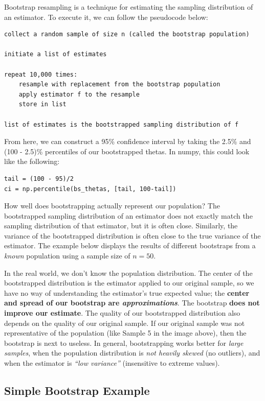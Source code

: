 \documentclass[
  letterpaper,
  DIV=11,
  numbers=noendperiod]{scrreprt}
\begin{document}
Bootstrap resampling is a technique for estimating the sampling
distribution of an estimator. To execute it, we can follow the
pseudocode below:

\begin{verbatim}
collect a random sample of size n (called the bootstrap population)

initiate a list of estimates

repeat 10,000 times:
    resample with replacement from the bootstrap population
    apply estimator f to the resample
    store in list

list of estimates is the bootstrapped sampling distribution of f
\end{verbatim}

From here, we can construct a 95\% confidence interval by taking the
2.5\% and (100 - 2.5)\% percentiles of our bootstrapped thetas. In
numpy, this could look like the following:

\begin{verbatim}
tail = (100 - 95)/2
ci = np.percentile(bs_thetas, [tail, 100-tail])
\end{verbatim}

How well does bootstrapping actually represent our population? The
bootstrapped sampling distribution of an estimator does not exactly
match the sampling distribution of that estimator, but it is often
close. Similarly, the variance of the bootstrapped distribution is often
close to the true variance of the estimator. The example below displays
the results of different bootstraps from a \emph{known} population using
a sample size of \(n=50\).

In the real world, we don't know the population distribution. The center
of the bootstrapped distribution is the estimator applied to our
original sample, so we have no way of understanding the estimator's true
expected value; the \textbf{center and spread of our bootstrap are
\emph{approximations}}. The bootstrap \textbf{does not improve our
estimate}. The quality of our bootstrapped distribution also depends on
the quality of our original sample. If our original sample was not
representative of the population (like Sample 5 in the image above),
then the bootstrap is next to useless. In general, bootstrapping works
better for \emph{large samples}, when the population distribution is
\emph{not heavily skewed} (no outliers), and when the estimator is
\emph{``low variance''} (insensitive to extreme values).

\subsection{Simple Bootstrap Example}\label{simple-bootstrap-example}
\end{document}
